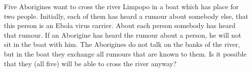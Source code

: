 \problem
Five Aborigines want to cross the river Limpopo in a boat which has place for two people. 
Initially, each of them has heard a rumour about somebody else, that this person is an Ebola virus carrier.
About each person somebody has heard that rumour.
If an Aborigine has heard the rumour about a person, he will not sit in the boat with him. 
The Aborigines do not talk on the banks of the river, but in the boat they exchange all rumours that are known to them. 
Is it possible that they (all five) will be able to cross the river anyway?
\solution
\endproblem
